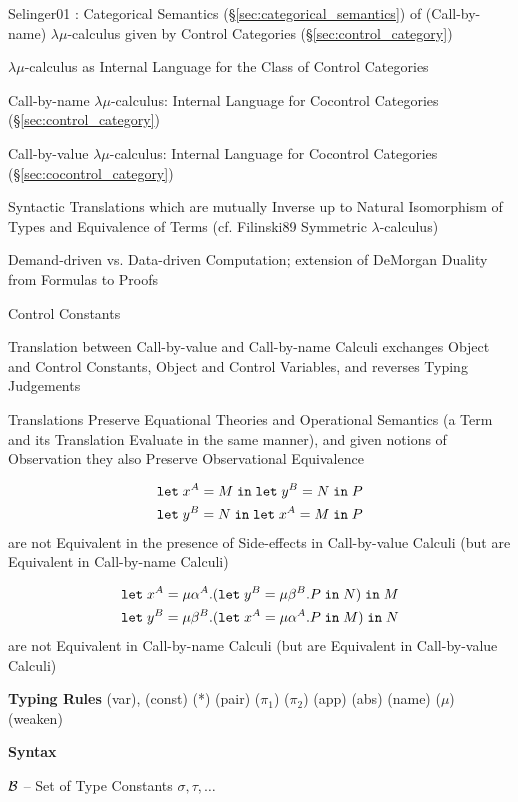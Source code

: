 Selinger01 \cite{selinger01}: Categorical Semantics
(\S\ref{sec:categorical_semantics}) of (Call-by-name)
$\lambda\mu$-calculus given by Control Categories
(\S\ref{sec:control_category})

$\lambda\mu$-calculus as Internal Language for the Class of Control
Categories

Call-by-name $\lambda\mu$-calculus: Internal Language for Cocontrol
Categories (\S\ref{sec:control_category})

Call-by-value $\lambda\mu$-calculus: Internal Language for Cocontrol
Categories (\S\ref{sec:cocontrol_category})

Syntactic Translations which are mutually Inverse up to Natural
Isomorphism of Types and Equivalence of Terms (cf. Filinski89
Symmetric $\lambda$-calculus) %

Demand-driven vs. Data-driven Computation; extension of DeMorgan
Duality from Formulas to Proofs %

Control Constants %

Translation between Call-by-value and Call-by-name Calculi exchanges
Object and Control Constants, Object and Control Variables, and
reverses Typing Judgements

Translations Preserve Equational Theories and Operational Semantics (a
Term and its Translation Evaluate in the same manner), and given
notions of Observation they also Preserve Observational Equivalence

\begin{align*}
  & \mathtt{let}\;x^A = M\;\mathtt{in}\;\mathtt{let}\;y^B = N\;\mathtt{in}\;P \\
  & \mathtt{let}\;y^B = N\;\mathtt{in}\;\mathtt{let}\;x^A = M\;\mathtt{in}\;P
\end{align*}
are not Equivalent in the presence of Side-effects in Call-by-value
Calculi (but are Equivalent in Call-by-name Calculi)

\begin{align*}
  & \mathtt{let}\;x^A = \mu\alpha^A.
    (\mathtt{let}\;y^B = \mu\beta^B.P\;\mathtt{in}\;N)\;\mathtt{in}\;M \\
  & \mathtt{let}\;y^B = \mu\beta^B.
    (\mathtt{let}\;x^A = \mu\alpha^A.P\;\mathtt{in}\;M)\;\mathtt{in}\;N
\end{align*}
are not Equivalent in Call-by-name Calculi (but are Equivalent in
Call-by-value Calculi)


\textbf{Typing Rules} (var), (const) (*) (pair) ($\pi_1$) ($\pi_2$)
(app) (abs) (name) ($\mu$) (weaken) %


\textbf{Syntax}

$\mathcal{B}$ -- Set of Type Constants $\sigma,\tau,\ldots$

